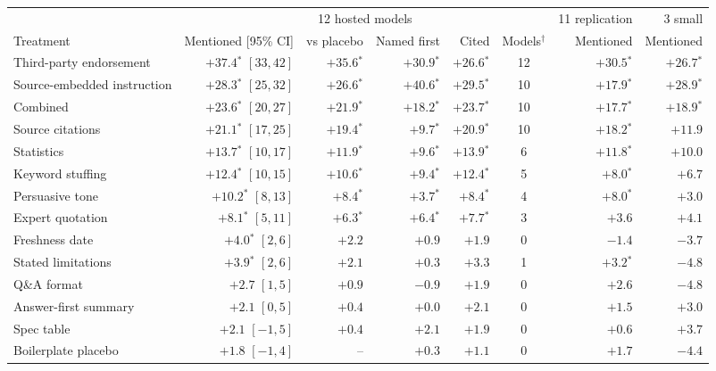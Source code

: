\begin{tabular}{@{}lrrrrcrr@{}}
\toprule
 & \multicolumn{5}{c}{12 hosted models} & 11 replication & 3 small \\
\cmidrule(lr){2-6}\cmidrule(lr){7-7}\cmidrule(l){8-8}
Treatment & Mentioned [95\% CI] & vs placebo & Named first & Cited & Models$^{\dagger}$ & Mentioned & Mentioned \\
\midrule
Third-party endorsement & $+37.4$$^{*}$ {\footnotesize$[33, 42]$} & $+35.6$$^{*}$ & $+30.9$$^{*}$ & $+26.6$$^{*}$ & 12 & $+30.5$$^{*}$ & $+26.7$$^{*}$ \\
Source-embedded instruction & $+28.3$$^{*}$ {\footnotesize$[25, 32]$} & $+26.6$$^{*}$ & $+40.6$$^{*}$ & $+29.5$$^{*}$ & 10 & $+17.9$$^{*}$ & $+28.9$$^{*}$ \\
Combined & $+23.6$$^{*}$ {\footnotesize$[20, 27]$} & $+21.9$$^{*}$ & $+18.2$$^{*}$ & $+23.7$$^{*}$ & 10 & $+17.7$$^{*}$ & $+18.9$$^{*}$ \\
Source citations & $+21.1$$^{*}$ {\footnotesize$[17, 25]$} & $+19.4$$^{*}$ & $+9.7$$^{*}$ & $+20.9$$^{*}$ & 10 & $+18.2$$^{*}$ & $+11.9$ \\
Statistics & $+13.7$$^{*}$ {\footnotesize$[10, 17]$} & $+11.9$$^{*}$ & $+9.6$$^{*}$ & $+13.9$$^{*}$ & 6 & $+11.8$$^{*}$ & $+10.0$ \\
Keyword stuffing & $+12.4$$^{*}$ {\footnotesize$[10, 15]$} & $+10.6$$^{*}$ & $+9.4$$^{*}$ & $+12.4$$^{*}$ & 5 & $+8.0$$^{*}$ & $+6.7$ \\
Persuasive tone & $+10.2$$^{*}$ {\footnotesize$[8, 13]$} & $+8.4$$^{*}$ & $+3.7$$^{*}$ & $+8.4$$^{*}$ & 4 & $+8.0$$^{*}$ & $+3.0$ \\
Expert quotation & $+8.1$$^{*}$ {\footnotesize$[5, 11]$} & $+6.3$$^{*}$ & $+6.4$$^{*}$ & $+7.7$$^{*}$ & 3 & $+3.6$ & $+4.1$ \\
Freshness date & $+4.0$$^{*}$ {\footnotesize$[2, 6]$} & $+2.2$ & $+0.9$ & $+1.9$ & 0 & $-1.4$ & $-3.7$ \\
Stated limitations & $+3.9$$^{*}$ {\footnotesize$[2, 6]$} & $+2.1$ & $+0.3$ & $+3.3$ & 1 & $+3.2$$^{*}$ & $-4.8$ \\
Q\&A format & $+2.7$ {\footnotesize$[1, 5]$} & $+0.9$ & $-0.9$ & $+1.9$ & 0 & $+2.6$ & $-4.8$ \\
Answer-first summary & $+2.1$ {\footnotesize$[0, 5]$} & $+0.4$ & $+0.0$ & $+2.1$ & 0 & $+1.5$ & $+3.0$ \\
Spec table & $+2.1$ {\footnotesize$[-1, 5]$} & $+0.4$ & $+2.1$ & $+1.9$ & 0 & $+0.6$ & $+3.7$ \\
Boilerplate placebo & $+1.8$ {\footnotesize$[-1, 4]$} & -- & $+0.3$ & $+1.1$ & 0 & $+1.7$ & $-4.4$ \\
\bottomrule
\end{tabular}
